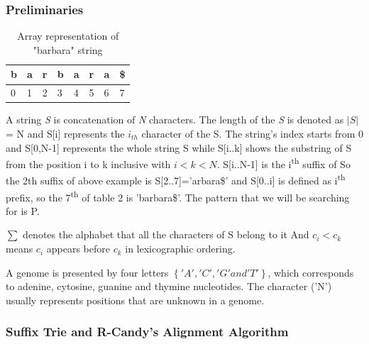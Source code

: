 \documentclass[11pt,a4paper]{report}
\begin{document}
\subsubsection{Preliminaries} \label{Preliminaries}

\begin{table}[h]
 \centering
  \begin{tabular}{ | p{0.5cm} | p{0.5cm} | p{0.5cm} 
  |p{0.5cm} |p{0.5cm} |p{0.5cm} |p{0.5cm} |p{0.5cm} |}
    \hline
  \textbf{b} & \textbf{a } &\textbf{r}  &\textbf{b} 
  &\textbf{a} &\textbf{r} &\textbf{a} &\textbf{\$}\\ \hline
       0 & 1 &2&3&4&5&6&7 \\ \hline
      
   \end{tabular}
\caption{Array representation of "barbara" string}
\label{Array-representation}
\end{table}



A string \emph{S} is concatenation of \emph{N} characters. 
The length of the \emph{S} is denoted as $\lvert S \rvert$ 
= N and S[i] represents the $i_{th}$ character of the S.
The string's index starts from 0 and S[0,N-1] represents 
the whole string S while S[i..k] shows the substring of S 
from the position i to k inclusive with $i < k < N$. 
S[i..N-1] is the i\textsuperscript{th} suffix of So the 
2th suffix of above example is S[2..7]='arbara\$' and
S[0..i] is defined as i\textsuperscript{th} prefix, so 
the 7\textsuperscript{th} of table 2 is 'barbara\$'.
The pattern that we will be searching for is P.

$ \sum $  denotes the alphabet that all the characters of 
S belong to it And $ c_{i} < c_{k}$ means $c_{i}$ appears 
before $c_{k}$ in lexicographic ordering.

A genome is presented by four letters $\left\{ 'A', 'C', 
'G' and 'T'\right\}$, which corresponds to adenine, cytosine, 
guanine and thymine nucleotides. The character ('N') usually 
represents positions that are unknown in a genome.





\subsubsection{Suffix Trie and R-Candy's Alignment Algorithm} 
\label{Suffix Trie and R-Candy's Alignment Algorithm}
\end{document}
